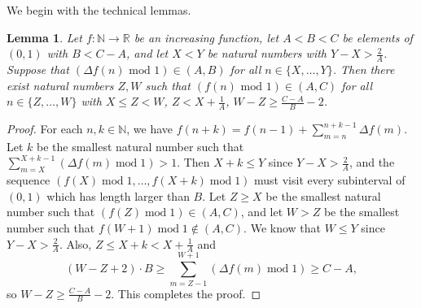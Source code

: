 \documentclass[12pt]{article}
\theoremstyle{plain} %
\newtheorem{lemma}[theorem]{Lemma}
\theoremstyle{definition} %
\theoremstyle{plain}
\theoremstyle{plain}
\numberwithin{equation}{section}
\newcommand{\N}{\mathbb{N}}
\newcommand{\R}{\mathbb{R}}
\renewcommand{\leq}{\leqslant}
\renewcommand{\geq}{\geqslant}
\newcommand{\1}{\mathbbm{1}}
\renewcommand{\mod}{\operatorname{mod}}
\begin{document}
We begin with the technical lemmas.


\begin{lemma}\label{lem:technical_1}
    Let $f: \N\rightarrow \R$ be an increasing function, let $A<B<C$ be elements of $(0,1)$ with $B<C-A$, and let $X<Y$ be natural numbers with $Y-X> \frac{2}{A}$. Suppose that $(\Delta f(n)\text{ mod } 1)\in (A,B)$ for all $n\in \{X,\dots, Y\}$. Then there exist natural numbers $Z,W$  such that $ (f(n)\text{ mod } 1)\in (A,C)$ for all $n\in \{Z,\dots, W\}$ with $X\leq Z<W$, $Z< X+\frac{1}{A}$, $W-Z\geq \frac{C-A}{B}-2$.
\end{lemma}
\begin{proof}
    For each $n,k\in \N$, we have $f(n+k)=f(n-1)+\sum_{m=n}^{n+k-1}\Delta f(m)$. Let $k$ be the smallest natural number such that $\sum_{m=X}^{X+k-1}(\Delta f(m)\mod 1)>1$. Then $X+k\leq Y$ since $Y-X>\frac{2}{A}$, and the sequence $(f(X)\mod 1,\dots, f(X+k)\mod 1)$ must visit every subinterval of $(0,1)$ which has length larger than $B$. Let $Z\geq X$ be the smallest natural number such that $(f(Z)\mod 1)\in (A,C)$, and let $W> Z$ be the smallest number such that $f(W+1)\mod 1\not\in (A,C)$. We know that $W\leq Y$ since $Y-X>\frac{2}{A}$. Also, $Z\leq X+k<X+\frac{1}{A}$ and 
    \begin{equation}
    (W-Z+2)\cdot B\geq \sum_{m=Z-1}^{W+1}(\Delta f(m)\mod 1)\geq  C-A,
    \end{equation}
    so $W-Z\geq \frac{C-A}{B}-2$. This completes the proof.
\end{proof}
\end{document}
